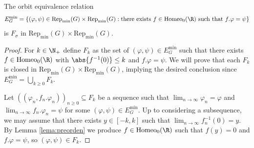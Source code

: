 \documentclass[reqno]{amsart}
\begin{document}
\begin{prop}\label{prop:fsigma}
The orbit equivalence relation 
\[
	E^\mathrm{min}_G = \{ (\varphi, \psi) \in \mathrm{Rep}_\mathrm{min}(G) \times \mathrm{Rep}_\mathrm{min}(G) : \text{there exists }f \in \mathrm{Homeo}_0(\R) \text{ such that }f. \varphi = \psi\}
\]
is $F_\sigma$ in $\mathrm{Rep}_\mathrm{min}(G) \times \mathrm{Rep}_\mathrm{min}(G)$.
\end{prop}
\begin{proof}
	For $k \in \N_+$ define $F_k$ as the set of $(\varphi, \psi) \in E^\mathrm{min}_G$ such that there exists $f \in \mathrm{Homeo}_0(\R)$ with $\abs{f^{-1}(0)} \leq k$ and $f.\varphi = \psi$. We will prove that each $F_k$ is closed in $\mathrm{Rep}_\mathrm{min}(G) \times \mathrm{Rep}_\mathrm{min}(G)$, implying the desired conclusion since $E^\mathrm{min}_G = \bigcup_{k \geq 0} F_k$. 

Let $((\varphi_n, f_n. \varphi_n))_{n \geq 0} \subseteq F_k$ be a sequence such that $\lim_{n \to \infty} \varphi_n  = \varphi$ and $\lim_{n \to \infty} f_n. \varphi_n = \psi$ for some $(\varphi, \psi) \in E^\mathrm{min}_G$. Up to considering a subsequence, we may assume that there exists $y \in [-k, k]$ such that $\lim_{n \to \infty} f_n^{-1}(0) = y$. By Lemma \ref{lema:preorden} we produce $f \in \mathrm{Homeo}_0(\R)$ such that $f(y) = 0$ and $f.\varphi = \psi$, so $(\varphi, \psi) \in F_k$.
\end{proof}
\end{document}
